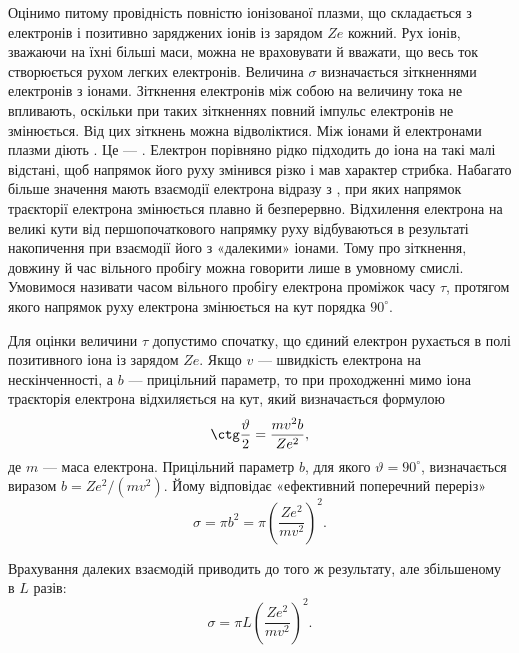 Оцінимо питому провідність повністю іонізованої плазми, що складається з електронів і позитивно заряджених іонів із зарядом $Ze$ кожний. Рух іонів, зважаючи на їхні більші маси, можна не враховувати й вважати, що весь ток створюється рухом легких електронів. Величина $\sigma$ визначається зіткненнями електронів з іонами. Зіткнення електронів між собою на величину тока не впливають, оскільки при таких зіткненнях повний імпульс електронів не змінюється. Від цих зіткнень можна відволіктися. Між іонами й електронами плазми діють . Це --- . Електрон порівняно рідко підходить до іона на такі малі відстані, щоб напрямок його руху змінився різко і мав характер стрибка. Набагато більше значення мають взаємодії електрона відразу з , при яких напрямок траєкторії електрона змінюється плавно й безперервно. Відхилення електрона на великі кути від першопочаткового напрямку руху відбуваються в результаті накопичення  при взаємодії його з «далекими» іонами. Тому про зіткнення, довжину й час вільного пробігу можна говорити лише в умовному смислі. Умовимося називати часом вільного пробігу електрона проміжок часу $\tau$, протягом якого напрямок руху електрона змінюється на кут порядка $90^\circ$.

Для оцінки величини $\tau$ допустимо спочатку, що єдиний електрон рухається в полі позитивного іона із зарядом $Ze$. Якщо $v$ --- швидкість електрона на нескінченності, а $b$ --- прицільний параметр, то при проходженні мимо іона траєкторія електрона відхиляється на кут, який визначається формулою
\begin{equation*}
	\ctg\frac{\vartheta}{2} = \frac{mv^2b}{Ze^2},
\end{equation*}
де $m$ --- маса електрона. Прицільний параметр $b$, для якого $\vartheta = 90^\circ$, визначається виразом $b = Ze^2/(mv^2)$. Йому відповідає «ефективний поперечний переріз»
\begin{equation*}
	\sigma = \pi b^2 = \pi\left(\frac{Ze^2}{mv^2}\right)^2.
\end{equation*}

Врахування далеких взаємодій приводить до того ж результату, але збільшеному в $L$ разів:
\begin{equation*}
	\sigma = \pi L\left(\frac{Ze^2}{mv^2}\right)^2.
\end{equation*}

